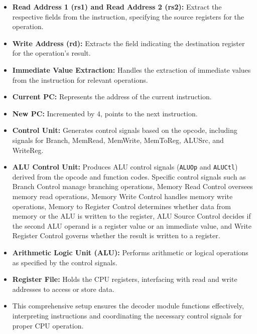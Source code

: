 \begin{itemize}
   
    \item \textbf{Read Address 1 (rs1) and Read Address 2 (rs2):} Extract the respective fields from the instruction, specifying the source registers for the operation.
    \item \textbf{Write Address (rd):} Extracts the field indicating the destination register for the operation's result.
    \item \textbf{Immediate Value Extraction:} Handles the extraction of immediate values from the instruction for relevant operations.
    \item \textbf{Current PC:} Represents the address of the current instruction.
    \item \textbf{New PC:} Incremented by 4, points to the next instruction.
    \item \textbf{Control Unit:} Generates control signals based on the opcode, including signals for Branch, MemRead, MemWrite, MemToReg, ALUSrc, and WriteReg.
    \item \textbf{ALU Control Unit:} Produces ALU control signals (\texttt{ALUOp} and \texttt{ALUCtl}) derived from the opcode and function codes. Specific control signals such as Branch Control manage branching operations, Memory Read Control oversees memory read operations, Memory Write Control handles memory write operations, Memory to Register Control determines whether data from memory or the ALU is written to the register, ALU Source Control decides if the second ALU operand is a register value or an immediate value, and Write Register Control governs whether the result is written to a register.
    \item \textbf{Arithmetic Logic Unit (ALU):} Performs arithmetic or logical operations as specified by the control signals.
    \item \textbf{Register File:} Holds the CPU registers, interfacing with read and write addresses to access or store data.
    \item This comprehensive setup ensures the decoder module functions effectively, interpreting instructions and coordinating the necessary control signals for proper CPU operation.
\end{itemize}


